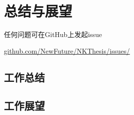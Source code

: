 \chapter{总结与展望}

任何问题可在GitHub上发起issue 

\href{https://github.com/NewFuture/NKThesis/issues/new}{github.com/NewFuture/NKThesis/issues/}
\section{工作总结}
\section{工作展望}